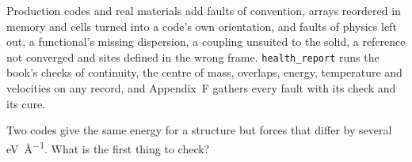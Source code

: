 \begin{keyidea}
Production codes and real materials add faults of convention, arrays
reordered in memory and cells turned into a code's own orientation, and
faults of physics left out, a functional's missing dispersion, a coupling
unsuited to the solid, a reference not converged and sites defined in the
wrong frame. \texttt{health\_report} runs the book's checks of continuity,
the centre of mass, overlaps, energy, temperature and velocities on any
record, and Appendix~F gathers every fault with its check and its cure.
\end{keyidea}


\begin{selfcheck}
Two codes give the same energy for a structure but forces that differ by
several \si{\electronvolt\per\angstrom}. What is the first thing to check?
\end{selfcheck}
